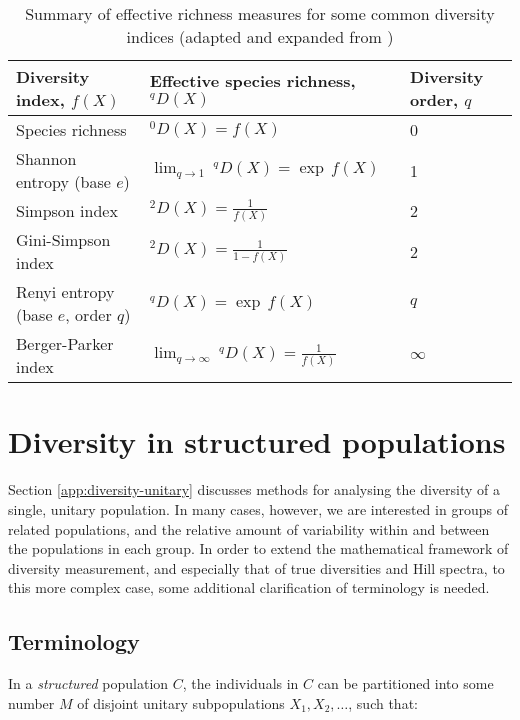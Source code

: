 \begin{table}
\centering
\caption{Summary of effective richness measures for some common diversity indices (adapted and expanded from \citep{jost2006entropy})}
\begin{tabular}{lll}\toprule
Diversity index, $f(X)$ & Effective species richness,~$^qD(X)$ & Diversity order, $q$\\\midrule
Species richness & $^0D(X) = f(X)$ & 0 \\
Shannon entropy (base $e$) & $\lim_{q \to 1}~^qD(X) = \exp\,f(X)$ & 1\\
Simpson index & $^2D(X) = \frac{1}{f(X)}$ & 2\\
Gini-Simpson index & $^2D(X) = \frac{1}{1-f(X)}$ & 2\\
Renyi entropy (base $e$, order $q$) & $^qD(X) = \exp\,f(X)$ & $q$\\
Berger-Parker index & $\lim_{q \to \infty}~^qD(X) = \frac{1}{f(X)}$ & $\infty$\\
\bottomrule
\end{tabular}
\label{tab:diversity}
\end{table}

\section{Diversity in structured populations}
\label{app:diversity-structured}

Section \ref{app:diversity-unitary} discusses methods for analysing the diversity of a single, unitary population. In many cases, however, we are interested in groups of related populations, and the relative amount of variability within and between the populations in each group. In order to extend the mathematical framework of diversity measurement, and especially that of true diversities and Hill spectra, to this more complex case, some additional clarification of terminology is needed.

\subsection{Terminology}
\label{app:diversity-structured-terminology}

In a \textit{structured} population $C$, the individuals in $C$ can be partitioned into some number $M$ of disjoint unitary subpopulations $X_1, X_2, \dots$, such that:

